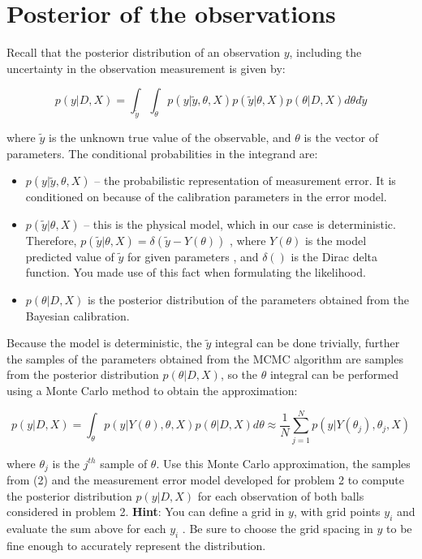 \documentclass{article}
\begin{document}
\section{Posterior of the observations}

Recall that the posterior distribution of an observation $y$, including
the uncertainty in the observation measurement is given by:

\begin{equation}
p\left(y|D,X\right)=\int_{\tilde{y}}\int_{\theta}p\left(y|\tilde{y},\theta,X\right)p\left(\tilde{y}|\theta,X\right)p\left(\theta|D,X\right)d\theta d\tilde{y}
\end{equation}


where $\tilde{y}$ is the unknown true value of the observable, and
$\theta$ is the vector of parameters. The conditional probabilities
in the integrand are:
\begin{itemize}
\item $p\left(y|\tilde{y},\theta,X\right)$ -- the probabilistic representation
of measurement error. It is conditioned on because of the calibration
parameters in the error model.
\item $p\left(\tilde{y}|\theta,X\right)$ -- this is the physical model,
which in our case is deterministic. Therefore, $p\left(\tilde{y}|\theta,X\right)=\delta\left(\tilde{y}-Y\left(\theta\right)\right)$
, where $Y\left(\theta\right)$ is the model predicted value of $\tilde{y}$
for given parameters , and $\delta\left(\right)$ is the Dirac delta
function. You made use of this fact when formulating the likelihood.
\item $p\left(\theta|D,X\right)$ is the posterior distribution of the parameters
obtained from the Bayesian calibration.
\end{itemize}
Because the model is deterministic, the $\tilde{y}$ integral can
be done trivially, further the samples of the parameters obtained
from the MCMC algorithm are samples from the posterior distribution
$p\left(\theta|D,X\right)$, so the $\theta$ integral can be performed
using a Monte Carlo method to obtain the approximation:

\begin{equation}
p\left(y|D,X\right)=\int_{\theta}p\left(y|Y\left(\theta\right),\theta,X\right)p\left(\theta|D,X\right)d\theta\approx\frac{1}{N}\sum_{j=1}^{N}p\left(y|Y\left(\theta_{j}\right),\theta_{j},X\right)
\end{equation}


where $\theta_{j}$ is the $j^{th}$ sample of $\theta$. Use this
Monte Carlo approximation, the samples from (2) and the measurement
error model developed for problem 2 to compute the posterior distribution
$p\left(y|D,X\right)$ for each observation of both balls considered
in problem 2. \textbf{Hint}: You can define a grid in $y$, with grid
points $y_{i}$ and evaluate the sum above for each $y_{i}$ . Be
sure to choose the grid spacing in $y$ to be fine enough to accurately
represent the distribution.
\end{document}
